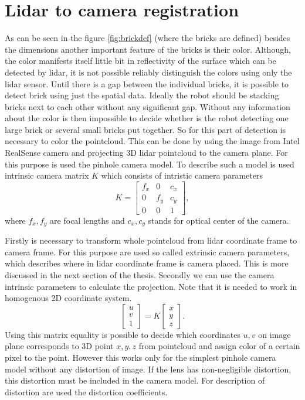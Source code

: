 \section{Lidar to camera registration}
As can be seen in the figure \ref{fig:brickdef} (where the bricks are defined) besides the dimensions another important feature of the bricks is their color. Although, the color manifests itself little bit in reflectivity of the surface which can be detected by lidar, it is not possible reliably distinguish the colors using only the lidar sensor. Until there is a gap between the individual bricks, it is possible to detect brick using just the spatial data. Ideally the robot should be stacking bricks next to each other without any significant gap. Without any information about the color is then impossible to decide whether is the robot detecting one large brick or several small bricks put together. So for this part of detection is necessary to color the pointcloud. This can be done by using the image from Intel RealSense camera and projecting 3D lidar pointcloud to the camera plane. For this purpose is used the pinhole camera model. To describe such a model is used intrinsic camera matrix $K$ which consists of intristic camera parameters \cite{hartley2017}
\begin{equation}
K = \begin{bmatrix}
f_x & 0 & c_x \\
0 & f_y & c_y \\
0 & 0 & 1
\end{bmatrix},
\end{equation}
where $f_x, f_y$ are focal lengths and $c_x, c_y$ stands for optical center of the camera.

Firstly is necessary to transform whole pointcloud from lidar coordinate frame to camera frame. For this purpose are used so called extrinsic camera parameters, which describes where in lidar coordinate frame is camera placed. This is more discussed in the next section of the thesis. Secondly we can use the camera intrinsic parameters to calculate the projection. Note that it is needed to work in homogenous 2D coordinate system.
\begin{equation}
\begin{bmatrix}
u\\
v\\
1
\end{bmatrix}
= K \begin{bmatrix}
x\\
y\\
z
\end{bmatrix}.
\end{equation}
Using this matrix equality is possible to decide which coordinates $u,v$ on image plane corresponds to 3D point $x,y,z$ from pointcloud and assign color of a certain pixel to the point. However this works only for the simplest pinhole camera model without any distortion of image. If the lens has non-negligible distortion, this distortion must be included in the camera model. For description of distortion are used the distortion coefficients.

